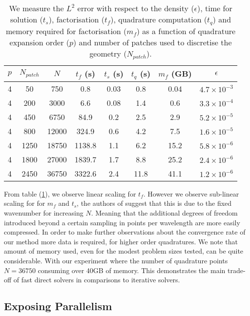 \begin{table}[h!]
    \centering
    \begin{tabular}{||c c c c c c c c||} 
        \hline
        $p$ & $N_{patch}$ & $N$  & $t_f$ (s) & $t_s$ (s)  & $t_q$ (s) & $m_f$ (GB) & $\epsilon$ \\ [0.5ex]
        \hline\hline
        4 & 50  & 750  & 0.8 & 0.03 & 0.8 & 0.04 & $4.7 \times 10^{-3}$ \\
        4 & 200 & 3000 & 6.6 & 0.08 & 1.4 & 0.6  & $3.3 \times 10^{-4}$ \\
        4 & 450 & 6750 & 84.9 & 0.2 & 2.5 & 2.9 & $5.2 \times 10^{-5}$ \\
        4 & 800 & 12000 & 324.9 & 0.6 & 4.2 & 7.5 & $1.6 \times 10^{-5}$ \\
        4 & 1250 & 18750 & 1138.8 & 1.1 & 6.2 & 15.2 & $5.8 \times 10^{-6}$ \\
        4 & 1800 & 27000 & 1839.7 & 1.7 & 8.8 & 25.2 & $2.4 \times 10^{-6}$ \\
        4 & 2450 & 36750 & 3322.6 & 2.4 & 11.8 & 41.1 & $1.2 \times 10^{-6}$ \\
        \hline
    \end{tabular}
    \caption{We measure the $L^2$ error with respect to the density  ($\epsilon$), time for solution ($t_s$), factorisation ($t_f$), quadrature computation ($t_q$) and memory required for factorisation ($m_f$) as a function of quadrature expansion order ($p$) and number of patches used to discretise the geometry ($N_{patch}$).}
    \label{table:sec_3_2:sh}
\end{table}


From table (\ref{table:sec_3_2:sh}), we observe linear scaling for $t_f$. However we observe sub-linear scaling for for $m_f$ and $t_s$, the authors of \cite{sushnikova2022fmm} suggest that this is due to the fixed wavenumber for increasing $N$. Meaning that the additional degrees of freedom introduced beyond a certain sampling in points per wavelength are more easily compressed. In order to make further observations about the convergence rate of our method more data is required, for higher order quadratures. We note that amount of memory used, even for the modest problem sizes tested, can be quite considerable. With our experiment where the number of quadrature points $N=36750$ consuming over 40GB of memory. This demonstrates the main trade-off of fast direct solvers in comparisons to iterative solvers.

\subsection*{Exposing Parallelism}

